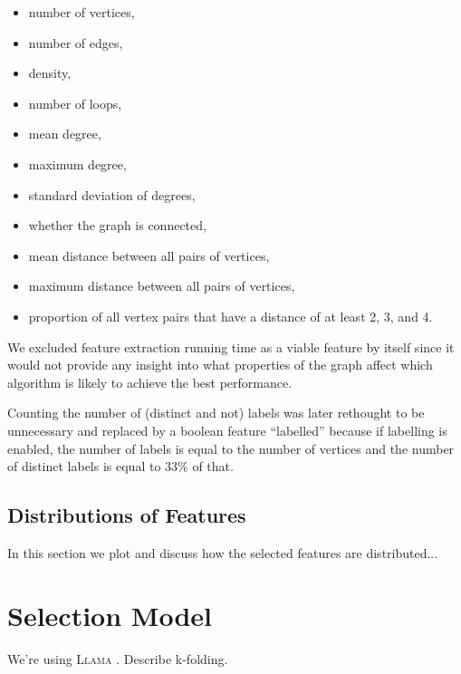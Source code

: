 \documentclass{article}
\theoremstyle{definition}
\begin{document}
\begin{itemize}
\item number of vertices,
\item number of edges,
\item density,
\item number of loops,
\item mean degree,
\item maximum degree,
\item standard deviation of degrees,
\item whether the graph is connected,
\item mean distance between all pairs of vertices,
\item maximum distance between all pairs of vertices,
\item proportion of all vertex pairs that have a distance of at least 2, 3, and 4.
\end{itemize}

We excluded feature extraction running time as a viable feature by itself since it would
not provide any insight into what properties of the graph affect which algorithm
is likely to achieve the best performance.

Counting the number of (distinct and not) labels was later rethought to be
unnecessary and replaced by a boolean feature ``labelled'' because if labelling
is enabled, the number of labels is equal to the number of vertices and the
number of distinct labels is equal to 33\% of that.

\subsection{Distributions of Features}
In this section we plot and discuss how the selected features are distributed...

\section{Selection Model}
We're using \textsc{Llama} \cite{kotthoff_llama_2013}. Describe k-folding.

\printbibliography
\end{document}
